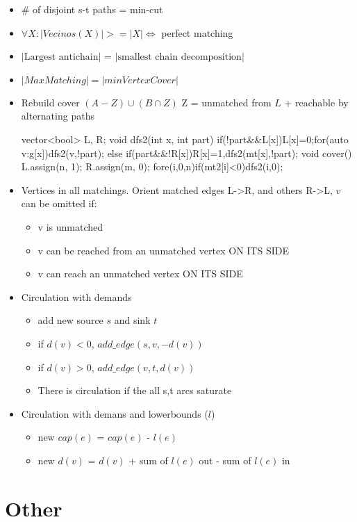 \begin{itemize}
  \item \# of disjoint s-t paths = min-cut
  \item $\forall X: |Vecinos(X)| >= |X| \iff$ perfect matching
  \item $|\text{Largest antichain}|$ = $|\text{smallest chain decomposition}|$
  \item $|Max Matching| = |min Vertex Cover|$
  \item Rebuild cover $(A-Z)\cup(B\cap Z)$ Z = unmatched from $L$ + reachable by alternating paths
  \begin{code}
  vector<bool> L, R;
  void dfs2(int x, int part) {
    if(!part&&L[x]){L[x]=0;for(auto v:g[x])dfs2(v,!part);}
    else if(part&&!R[x])R[x]=1,dfs2(mt[x],!part);
  }
  void cover() {L.assign(n, 1); R.assign(m, 0);
    fore(i,0,n)if(mt2[i]<0)dfs2(i,0);
  }\end{code}
  \item Vertices in all matchings. Orient matched edges L->R, and others R->L, $v$ can be omitted if:
    \begin{itemize}
      \item v is unmatched
      \item v can be reached from an unmatched vertex ON ITS SIDE
      \item v can reach an unmatched vertex ON ITS SIDE
    \end{itemize}
  \item Circulation with demands
  \begin{itemize}
    \item add new source $s$ and sink $t$
    \item if $d(v) < 0$, $add\_edge(s, v, -d(v))$
    \item if $d(v) > 0$, $add\_edge(v, t, d(v))$
    \item There is circulation if the all s,t arcs saturate
  \end{itemize}
  \item Circulation with demans and lowerbounds ($l$)
  \begin{itemize}
    \item new $cap(e)$ = $cap(e)$ - $l(e)$
    \item new $d(v)$ = $d(v)$ + sum of $l(e)$ out - sum of $l(e)$ in
  \end{itemize}
\end{itemize}


\section{Other}

